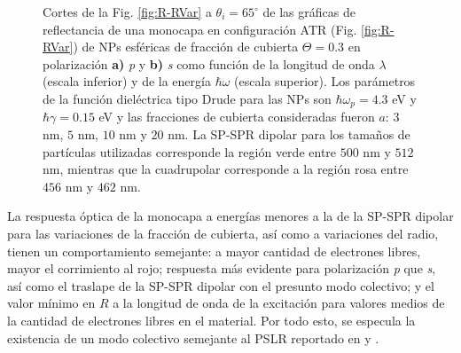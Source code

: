 \begin{figure}[h!]
	\caption{Cortes de la Fig. \ref{fig:R-RVar} a $\theta_i = 65^\circ$ de las gráficas de reflectancia de una monocapa en configuración ATR (Fig. \ref{fig:R-RVar}) de NPs esféricas de fracción de cubierta $\Theta = 0.3$ en polarización \textbf{a)} \emph{p} y \textbf{b)} \emph{s} como función de la longitud de onda $\lambda$ (escala inferior) y de la energía $\hbar\omega$ (escala superior). Los parámetros de la función dieléctrica tipo Drude para las NPs son $\hbar\omega_p = 4.3$ eV y $\hbar\gamma = 0.15$ eV y las fracciones de cubierta consideradas fueron $a$: $3$ nm, $5$ nm, $10$ nm y $20$ nm. La SP-SPR dipolar para los tamaños de partículas utilizadas corresponde la región verde entre $500$ nm y $512$ nm, mientras que la cuadrupolar corresponde a la región rosa entre $456$ nm y $462$ nm.}\label{fig:R-RVar-Cuts}
	\end{figure}	

La respuesta óptica de la monocapa a energías menores a la de la SP-SPR dipolar para las variaciones de la fracción de cubierta, así como a variaciones del radio, tienen un comportamiento semejante: a mayor cantidad de electrones libres, mayor el corrimiento al rojo; respuesta más evidente para polarización \emph{p} que \emph{s}, así como el traslape  de la SP-SPR dipolar con el presunto modo colectivo; y el valor mínimo en $R$ a la longitud de onda de la excitación para valores medios de la cantidad de electrones libres en el material. Por todo esto, se especula la existencia de un modo colectivo semejante al PSLR reportado en  \cite{kabashin2009plasmonic} y \cite{danilov2018ultra}. 

